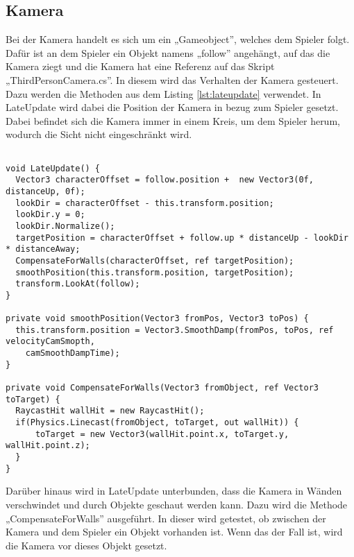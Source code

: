 \subsection{Kamera}
	Bei der Kamera handelt es sich um ein „Gameobject”, welches dem Spieler folgt. Dafür ist an dem Spieler ein Objekt namens „follow” angehängt, auf das die Kamera ziegt und die Kamera hat eine Referenz auf das Skript „ThirdPersonCamera.cs”. In diesem wird das Verhalten der Kamera gesteuert. Dazu werden die Methoden aus dem Listing \ref{lst:lateupdate} verwendet. In LateUpdate wird dabei die Position der Kamera in bezug zum Spieler gesetzt. Dabei befindet sich die Kamera immer in einem Kreis, um dem Spieler herum, wodurch die Sicht nicht eingeschränkt wird.

\begin{scriptsize}
\lstset{
	float,
	caption=Methode LateUpdate aus ThirdPersonCamera.cs, 
	language=[Sharp]C, 
	frame=single,  
	showstringspaces=false, 
	showspaces=false, 
	numbers=left, 
	captionpos=b, 
	belowcaptionskip=4pt,
	basicstyle=\ttfamily
} 
\begin{lstlisting}[label=lst:lateupdate]

void LateUpdate() {
  Vector3 characterOffset = follow.position +  new Vector3(0f, distanceUp, 0f);
  lookDir = characterOffset - this.transform.position;
  lookDir.y = 0;
  lookDir.Normalize();
  targetPosition = characterOffset + follow.up * distanceUp - lookDir * distanceAway;
  CompensateForWalls(characterOffset, ref targetPosition);
  smoothPosition(this.transform.position, targetPosition);
  transform.LookAt(follow);
}

private void smoothPosition(Vector3 fromPos, Vector3 toPos) {
  this.transform.position = Vector3.SmoothDamp(fromPos, toPos, ref velocityCamSmopth, 
  	camSmoothDampTime);
}

private void CompensateForWalls(Vector3 fromObject, ref Vector3 toTarget) {
  RaycastHit wallHit = new RaycastHit();
  if(Physics.Linecast(fromObject, toTarget, out wallHit)) {
      toTarget = new Vector3(wallHit.point.x, toTarget.y, wallHit.point.z);
  }
}

\end{lstlisting}
\end{scriptsize}

Darüber hinaus wird in LateUpdate unterbunden, dass die Kamera in Wänden verschwindet und durch Objekte geschaut werden kann. Dazu wird die Methode „CompensateForWalls” ausgeführt. In dieser wird getestet, ob zwischen der Kamera und dem Spieler ein Objekt vorhanden ist. Wenn das der Fall ist, wird die Kamera vor dieses Objekt gesetzt.

